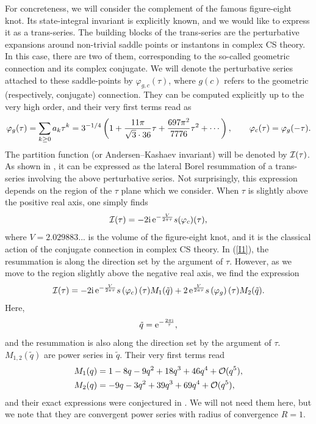 \documentclass[a4paper,11pt]{article}
\theoremstyle{definition}
\newcommand{\CI}{{\cal I}}
\newcommand{\CO}{{\cal O}}
\newcommand{\re}{{\rm e}}
\newcommand{\ri}{{\rm i}}
\newcommand{\be}{\begin{equation}}
\newcommand{\ee}{\end{equation}}
\newcommand{\ba}{\begin{aligned}}
\newcommand{\ea}{\end{aligned}}
\begin{document}
For concreteness, we will consider the complement of the famous figure-eight knot. Its state-integral 
invariant is explicitly known, and we would like to express it as a trans-series. The building blocks of the 
trans-series are the perturbative expansions around non-trivial saddle points or instantons in 
complex CS theory. In this case, there are two of them, corresponding to the so-called 
geometric connection and its complex conjugate. We will denote the perturbative series 
attached to these saddle-points by $\varphi_{g,c}(\tau)$, where $g (c)$ refers to the geometric 
(respectively, conjugate) connection. They can be computed explicitly up to the very high order, and their very first terms read as 
%
\be
\varphi_g(\tau)=  \sum_{k \ge 0} a_k \tau^k= 3^{-1/4} \left( 1+  {11 \pi \over {\sqrt{3}}\cdot  36} \tau+ {697 \pi^2 \over 7776} \tau^2+ \cdots \right), \qquad 
\varphi_c(\tau)= \varphi_g(-\tau). 
\ee
%
The partition function (or Andersen--Kashaev invariant) will be denoted by $\CI (\tau)$. As shown in \cite{ggm1}, it 
can be expressed as the lateral Borel resummation of a trans-series involving the above perturbative series. 
Not surprisingly, this expression depends on the region of the $\tau$ plane which we consider. When $\tau$ is slightly above the positive real axis, one simply finds
%
\be
\label{I1}
\CI(\tau) = -2 \ri \, \re^{-{V \over 2 \pi \tau}} s(\varphi_c)(\tau), 
\ee
%
where $V=2.029883...$ is the volume of the figure-eight knot, and it is the classical action of the conjugate connection in complex 
CS theory. In (\ref{I1}), the resummation is along the direction set by the argument of $\tau$. However, as 
we move to the region slightly above the negative real axis, we find the expression 
%
\be
\label{I2}
\CI(\tau)=-2 \ri \, \re^{-{V \over 2 \pi \tau}} s\left(\varphi_c\right)(\tau) M_1 (\tilde q) 
+ 2 \, \re^{{V \over 2 \pi \tau}} s\left(\varphi_g\right)(\tau) M_2(\tilde q).  
 \ee
Here, 
%
\be
\tilde q= \re^{-{2 \pi \ri \over \tau}}, 
\ee
%
and the resummation is also along the direction set by the argument of $\tau$. 
$M_{1,2}(\tilde q)$ are power series in $\tilde q$. Their very first terms read
%
\be
\ba
M_1 (q)&= 1 - 8 q -9 q^2 + 18 q^3+ 46 q^4+\CO(q^5),\\
M_2 (q)&=-9 q - 3 q^2 + 39 q^3 + 69 q^4 + \CO(q^5), 
\ea
\ee
%
and their exact expressions were conjectured in \cite{ggm1}. We will not need them 
here, but we note that they are convergent power series with radius of convergence $R=1$. 
\end{document}
